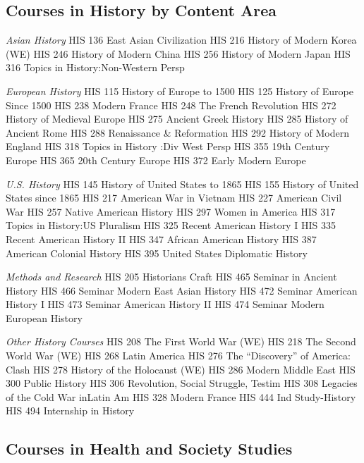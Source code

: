 \documentclass[
  letterpaper,
]{scrbook}
\begin{document}
\hypertarget{courses-in-history-by-content-area}{%
\subsection{Courses in History by Content
Area}\label{courses-in-history-by-content-area}}

\emph{Asian History} HIS 136 East Asian Civilization HIS 216 History of
Modern Korea (WE) HIS 246 History of Modern China HIS 256 History of
Modern Japan HIS 316 Topics in History:Non-Western Persp

\emph{European History} HIS 115 History of Europe to 1500 HIS 125
History of Europe Since 1500 HIS 238 Modern France HIS 248 The French
Revolution HIS 272 History of Medieval Europe HIS 275 Ancient Greek
History HIS 285 History of Ancient Rome HIS 288 Renaissance \&
Reformation HIS 292 History of Modern England HIS 318 Topics in History
:Div West Persp HIS 355 19th Century Europe HIS 365 20th Century Europe
HIS 372 Early Modern Europe

\emph{U.S. History} HIS 145 History of United States to 1865 HIS 155
History of United States since 1865 HIS 217 American War in Vietnam HIS
227 American Civil War HIS 257 Native American History HIS 297 Women in
America HIS 317 Topics in History:US Pluralism HIS 325 Recent American
History I HIS 335 Recent American History II HIS 347 African American
History HIS 387 American Colonial History HIS 395 United States
Diplomatic History

\emph{Methods and Research} HIS 205 Historians Craft HIS 465 Seminar in
Ancient History HIS 466 Seminar Modern East Asian History HIS 472
Seminar American History I HIS 473 Seminar American History II HIS 474
Seminar Modern European History

\emph{Other History Courses} HIS 208 The First World War (WE) HIS 218
The Second World War (WE) HIS 268 Latin America HIS 276 The
``Discovery'' of America: Clash HIS 278 History of the Holocaust (WE)
HIS 286 Modern Middle East HIS 300 Public History HIS 306 Revolution,
Social Struggle, Testim HIS 308 Legacies of the Cold War inLatin Am HIS
328 Modern France HIS 444 Ind Study-History HIS 494 Internship in
History

\hypertarget{courses-in-health-and-society-studies}{%
\subsection{Courses in Health and Society
Studies}\label{courses-in-health-and-society-studies}}
\end{document}
